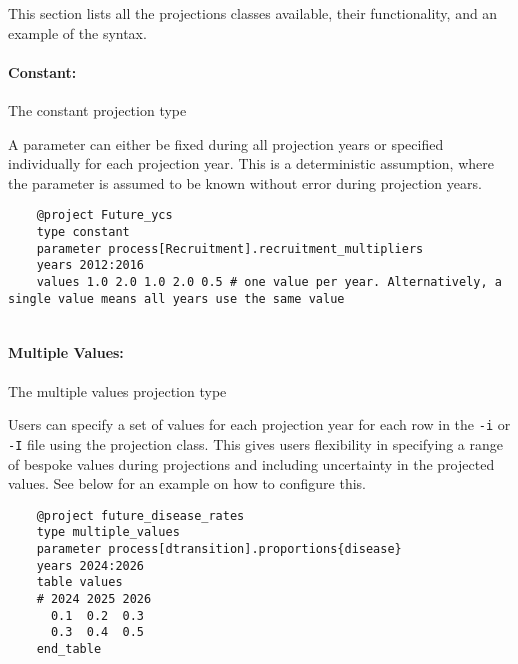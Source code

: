 \subsubsection{\label{sec:ProjectionMethods}}

This section lists all the projections classes available, their functionality, and an example of the syntax.

\paragraph[Constant]{Constant:} The constant projection type  \label{sec:Project-Constant}

A parameter can either be fixed during all projection years or specified individually for each projection year. This is a deterministic assumption, where the parameter is assumed to be known without error during projection years.

{\small{\begin{verbatim}
	@project Future_ycs
	type constant
	parameter process[Recruitment].recruitment_multipliers
	years 2012:2016
	values 1.0 2.0 1.0 2.0 0.5 # one value per year. Alternatively, a single value means all years use the same value
	
\end{verbatim}}}

\paragraph[Multiple Values]{Multiple Values:} The multiple values projection type  \label{sec:Project-MultipleValues}

Users can specify a set of values for each projection year for each row in the \texttt{-i} or \texttt{-I} file using the  projection class. This gives users flexibility in specifying a range of bespoke values during projections and including uncertainty in the projected values. See below for an example on how to configure this.

{\small{\begin{verbatim}
	@project future_disease_rates
	type multiple_values
	parameter process[dtransition].proportions{disease}  
	years 2024:2026
	table values
	# 2024 2025 2026
	  0.1  0.2  0.3
	  0.3  0.4  0.5
	end_table
\end{verbatim}}}

